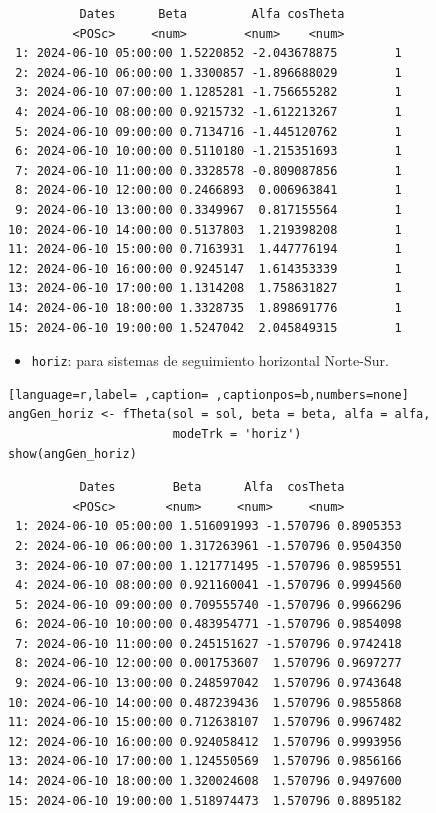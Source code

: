 \begin{itemize}
\begin{verbatim}
		  Dates      Beta         Alfa cosTheta
		 <POSc>     <num>        <num>    <num>
 1: 2024-06-10 05:00:00 1.5220852 -2.043678875        1
 2: 2024-06-10 06:00:00 1.3300857 -1.896688029        1
 3: 2024-06-10 07:00:00 1.1285281 -1.756655282        1
 4: 2024-06-10 08:00:00 0.9215732 -1.612213267        1
 5: 2024-06-10 09:00:00 0.7134716 -1.445120762        1
 6: 2024-06-10 10:00:00 0.5110180 -1.215351693        1
 7: 2024-06-10 11:00:00 0.3328578 -0.809087856        1
 8: 2024-06-10 12:00:00 0.2466893  0.006963841        1
 9: 2024-06-10 13:00:00 0.3349967  0.817155564        1
10: 2024-06-10 14:00:00 0.5137803  1.219398208        1
11: 2024-06-10 15:00:00 0.7163931  1.447776194        1
12: 2024-06-10 16:00:00 0.9245147  1.614353339        1
13: 2024-06-10 17:00:00 1.1314208  1.758631827        1
14: 2024-06-10 18:00:00 1.3328735  1.898691776        1
15: 2024-06-10 19:00:00 1.5247042  2.045849315        1
\end{verbatim}

\begin{itemize}
\item \texttt{horiz}: para sistemas de seguimiento horizontal Norte-Sur.
\end{itemize}
\begin{lstlisting}[language=r,label= ,caption= ,captionpos=b,numbers=none]
angGen_horiz <- fTheta(sol = sol, beta = beta, alfa = alfa,
                       modeTrk = 'horiz')
show(angGen_horiz)
\end{lstlisting}

\begin{verbatim}
		  Dates        Beta      Alfa  cosTheta
		 <POSc>       <num>     <num>     <num>
 1: 2024-06-10 05:00:00 1.516091993 -1.570796 0.8905353
 2: 2024-06-10 06:00:00 1.317263961 -1.570796 0.9504350
 3: 2024-06-10 07:00:00 1.121771495 -1.570796 0.9859551
 4: 2024-06-10 08:00:00 0.921160041 -1.570796 0.9994560
 5: 2024-06-10 09:00:00 0.709555740 -1.570796 0.9966296
 6: 2024-06-10 10:00:00 0.483954771 -1.570796 0.9854098
 7: 2024-06-10 11:00:00 0.245151627 -1.570796 0.9742418
 8: 2024-06-10 12:00:00 0.001753607  1.570796 0.9697277
 9: 2024-06-10 13:00:00 0.248597042  1.570796 0.9743648
10: 2024-06-10 14:00:00 0.487239436  1.570796 0.9855868
11: 2024-06-10 15:00:00 0.712638107  1.570796 0.9967482
12: 2024-06-10 16:00:00 0.924058412  1.570796 0.9993956
13: 2024-06-10 17:00:00 1.124550569  1.570796 0.9856166
14: 2024-06-10 18:00:00 1.320024608  1.570796 0.9497600
15: 2024-06-10 19:00:00 1.518974473  1.570796 0.8895182
\end{verbatim}


\end{itemize}
